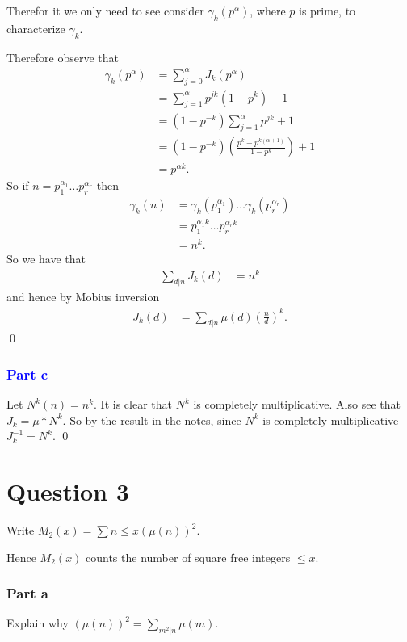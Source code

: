 \documentclass{unswmaths}
\begin{document}
Therefor it we only need to see consider $ \gamma_k(p^\alpha) $, where $ p $ is prime,
to characterize $ \gamma_k $.

Therefore observe that
\begin{align*}
    \gamma_k(p^\alpha) &= \sum_{j = 0}^\alpha J_k(p^\alpha) \\
        &= \sum_{j = 1}^\alpha p^{jk}(1-p^k) + 1 \\
        &= (1-p^{-k}) \sum_{j=1}^\alpha p^{jk} + 1 \\
        &= ( 1 - p^{-k})\left( \frac{p^k - p^{k(\alpha + 1)}}{1 - p^k} \right) + 1 \\
        &= p^{\alpha k}.
\end{align*}
So if $ n = p_1^{\alpha_1} \ldots p_r^{\alpha_r} $ then
\begin{align*}
    \gamma_k(n) &= \gamma_k(p_1^{\alpha_1}) \ldots \gamma_k(p_r^{\alpha_r}) \\
        &= p_1^{\alpha_1 k} \ldots p_r^{\alpha_r k} \\
        &= n^k.
\end{align*}
So we have that
\begin{align*}
    \sum_{d|n} J_k(d) &= n^k
\end{align*}
and hence by Mobius inversion
\begin{align*}
    J_k(d) &= \sum_{d|n} \mu(d) \left(\frac{n}{d}\right)^k.
\end{align*}
\qed
\subsubsection*{\textcolor{blue}{Part c}}

Let $ N^k(n) = n^k $. It is clear that $ N^k $ is completely multiplicative. 
Also see that $ J_k = \mu * N^k $. So by the result in the notes, since $ N^k $ is 
completely multiplicative $ J_k^{-1} = N^{k} $.
\qed

\hrulefill

\section*{Question 3}

Write $ M_2(x) = \sum{ n \leq x } (\mu(n))^2 $.

Hence $ M_2(x) $ counts the number of square free integers $ \leq x $.

\subsubsection*{Part a}
Explain why $ (\mu(n))^2 = \sum_{m^2 | n} \mu(m) $.
\end{document}
